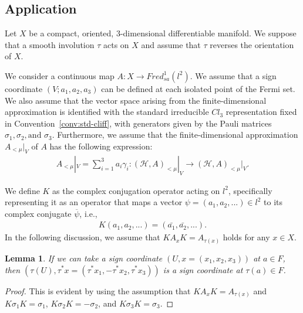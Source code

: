 \documentclass{amsart}
\newtheorem{lem}[thm]{Lemma}
\theoremstyle{definition}
\theoremstyle{remark}
\begin{document}

\subsection{Application}
\label{subsec:Appurication}                                                         



Let $X$ be a compact, oriented, $3$-dimensional differentiable manifold. We suppose that a smooth involution $\tau$ acts on $X$ and assume that $\tau$ reverses the orientation of $X$.

We consider a continuous map $A \colon X \to Fred_{sa}^1(l^2)$. We assume that a sign coordinate $(V; a_1, a_2, a_3)$ can be defined at each isolated point of the Fermi set. We also assume that the vector space arising from the finite-dimensional approximation is identified with the standard irreducible $Cl_3$ representation fixed in Convention~\ref{conv:std-cliff}, with generators given by the Pauli matrices \( \sigma_1, \sigma_2, \text{and } \sigma_3 \).  
Furthermore, we assume that the finite-dimensional approximation \( A_{<\mu}|_V \) of \( A \) has the following expression:
\begin{align*}
A_{<\mu}|_V = \sum_{i=1}^{3} a_i \gamma_i \colon (\mathcal{H}, A)_{<\mu}|_V \to (\mathcal{H}, A)_{<\mu}|_V.
\end{align*}

We define $K$ as the complex conjugation operator acting on $l^2$, specifically representing it as an operator that maps a vector $\psi=(a_1, a_2,...) \in l^2$ to its complex conjugate $\overline{\psi}$, i.e.,
\begin{align*}
K(a_1, a_2,...) = (\bar{a_1}, \bar{a_2},...).
\end{align*}
In the following discussion, we assume that $K A_x K = A_{\tau(x)}$ holds for any $x \in X$.


\begin{lem}\label{lem:4.16}
If we can take a sign coordinate $(U,x=(x_1, x_2, x_3))$ at $a\in F$, then $(\tau(U), \tau^{*}x=(\tau^{*}x_1, -\tau^{*}x_2, \tau^{*}x_3))$ is a sign coordinate at $\tau(a) \in F$.
\end{lem}

\begin{proof}
This is evident by using the assumption that $KA_{x}K=A_{\tau(x)}$ and $K\sigma_{1}K=\sigma_1$, $K\sigma_{2}K=-\sigma_{2}$, and $K\sigma_{3}K=\sigma_3$.
\end{proof}
\end{document}
